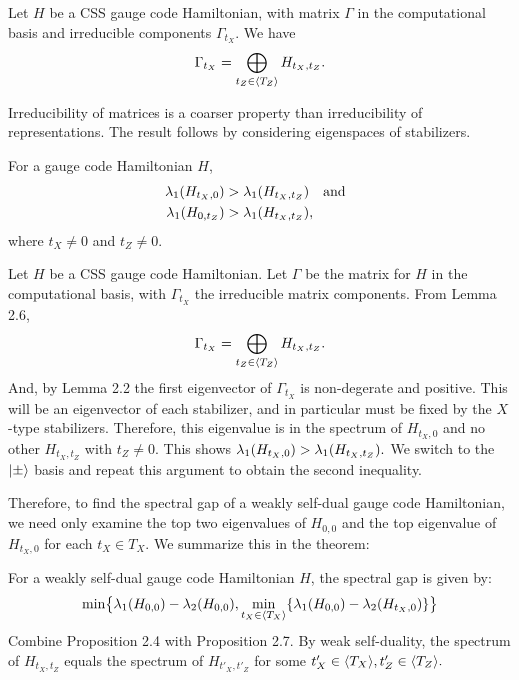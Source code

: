 Let $H$ be a CSS gauge code Hamiltonian,
with matrix $\Gamma$ in the computational basis 
and irreducible components $\Gamma_{t_X}$.
We have
$$
    \Gamma_{t_X} = \bigoplus_{t_Z\in\langle T_Z \rangle}
        H_{t_X,t_Z}.
$$

\doproof
Irreducibility of matrices is a coarser property than irreducibility of 
representations. 
The result follows by considering eigenspaces of stabilizers.
\tombstone

For a gauge code Hamiltonian $H$,
\begin{align*}
\lambda_1(H_{t_X,0}) &> 
    \lambda_1(H_{t_X,t_Z}) \ \ \ \mbox{and}\ \ \\
\lambda_1(H_{0,t_Z}) &> 
    \lambda_1(H_{t_X,t_Z}),
\end{align*}
where $t_X\ne 0$ and $t_Z\ne 0.$

\doproof
Let $H$ be a CSS gauge code Hamiltonian.
Let $\Gamma$ be the matrix for $H$ in the computational basis,
with $\Gamma_{t_X}$ the irreducible matrix components.
From Lemma 2.6,
$$
    \Gamma_{t_X} = \bigoplus_{t_Z\in\langle T_Z \rangle}
        H_{t_X,t_Z}.
$$
And, by Lemma 2.2 the first eigenvector of $\Gamma_{t_X}$ is 
non-degerate and positive.
This will be an eigenvector of each stabilizer, and in particular
must be fixed by the $X$-type stabilizers.
Therefore, this eigenvalue is in the spectrum of $H_{t_X,0}$ and
no other $H_{t_X,t_Z}$ with $t_Z\ne 0.$
This shows 
$\lambda_1(H_{t_X,0}) > \lambda_1(H_{t_X,t_Z}).$
We switch to the $|{\pm}\rangle$ basis and repeat this argument
to obtain the second inequality.
\tombstone

Therefore,
to find the spectral gap of a weakly self-dual gauge code Hamiltonian,
we need only examine the top two eigenvalues of $H_{0,0}$ and 
the top eigenvalue of $H_{t_X,0}$ for each $t_X\in T_X.$ 
We summarize this in the theorem:

For a weakly self-dual gauge code Hamiltonian $H$,
the spectral gap is given by:
$$
    \min \bigl\{ \lambda_1(H_{0,0}) - \lambda_2(H_{0,0}),
        \min_{t_X\in\langle T_X \rangle} 
         \{ \lambda_1(H_{0,0}) - \lambda_2(H_{t_X,0}) \} \bigr\}
$$
\doproof
Combine Proposition 2.4 with Proposition 2.7.
By weak self-duality, the spectrum of $H_{t_X,t_Z}$ equals
the spectrum of $H_{t'_X,t'_Z}$ for some 
$t'_X\in\langle T_X \rangle, t'_Z\in\langle T_Z \rangle.$
\tombstone


